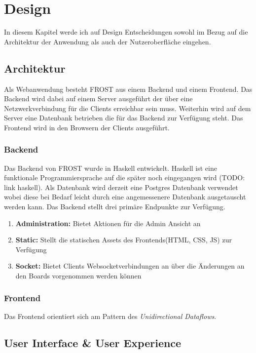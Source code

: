 \chapter{Design}
In diesem Kapitel werde ich auf Design Entscheidungen sowohl im Bezug auf die
Architektur der Anwendung als auch der Nutzeroberfläche eingehen.
\section{Architektur}
\label{sec:architektur}
Als Webanwendung besteht FROST aus einem Backend und einem Frontend. Das Backend
wird dabei auf einem Server ausgeführt der über eine Netzwerkverbindung für die
Clients erreichbar sein muss. Weiterhin wird auf dem Server eine Datenbank
betrieben die für das Backend zur Verfügung steht. Das Frontend wird in den
Browsern der Clients ausgeführt.
\subsection*{Backend}
\label{sec:backend}
Das Backend von FROST wurde in Haskell entwickelt. Haskell ist eine funktionale
Programmiersprache auf die später noch eingegangen wird (TODO: link haskell).
Als Datenbank wird derzeit eine Postgres Datenbank verwendet wobei diese bei
Bedarf leicht durch eine angemessenere Datenbank ausgetauscht werden kann. Das
Backend stellt drei primäre Endpunkte zur Verfügung.

\begin{enumerate}
\item \textbf{Administration:} Bietet Aktionen für die Admin Ansicht an
\item \textbf{Static:} Stellt die statischen Assets des Frontends(HTML, CSS, JS)
  zur Verfügung
\item \textbf{Socket:} Bietet Clients Websocketverbindungen an über die
  Änderungen an den Boards vorgenommen werden können
\end{enumerate}

\subsection*{Frontend}
\label{sec:frontend}
Das Frontend orientiert sich am Pattern des \textit{Unidirectional Dataflows}.

\section{User Interface \& User Experience}

